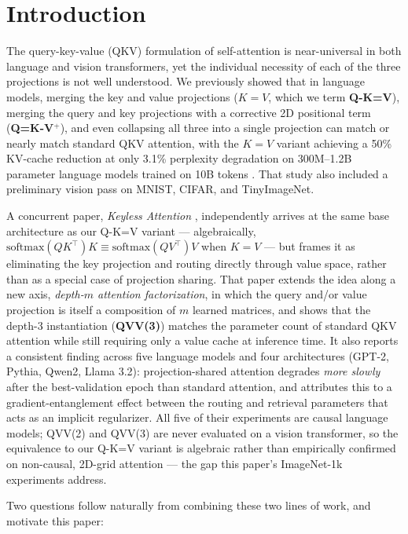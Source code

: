 \documentclass[11pt]{article}
\begin{document}
\section{Introduction}
\label{sec:intro}

The query-key-value (QKV) formulation of self-attention \citep{vaswani2017attention}
is near-universal in both language and vision transformers, yet the individual
necessity of each of the three projections is not well understood. We
previously showed that in language models, merging the key and value
projections (\(K = V\), which we term \textbf{Q-K=V}), merging the query and
key projections with a corrective 2D positional term (\textbf{Q=K-V}\(^+\)),
and even collapsing all three into a single projection can match or nearly
match standard QKV attention, with the \(K{=}V\) variant achieving a 50\%
KV-cache reduction at only 3.1\% perplexity degradation on 300M--1.2B
parameter language models trained on 10B tokens \citep{kayyam2026three}.
That study also included a preliminary vision pass on MNIST, CIFAR, and
TinyImageNet.

A concurrent paper, \emph{Keyless Attention} \citep{gao2026keyless},
independently arrives at the same base architecture as our Q-K=V variant ---
algebraically, \(\mathrm{softmax}(QK^\top)K \equiv \mathrm{softmax}(QV^\top)V\)
when \(K=V\) --- but frames it as eliminating the key projection and routing
directly through value space, rather than as a special case of projection
sharing. That paper extends the idea along a new axis, \emph{depth-\(m\)
attention factorization}, in which the query and/or value projection is
itself a composition of \(m\) learned matrices, and shows that the depth-3
instantiation (\textbf{QVV(3)}) matches the parameter count of standard QKV
attention while still requiring only a value cache at inference time. It
also reports a consistent finding across five language models and four
architectures (GPT-2, Pythia, Qwen2, Llama 3.2): projection-shared attention
degrades \emph{more slowly} after the best-validation epoch than standard
attention, and attributes this to a gradient-entanglement effect between the
routing and retrieval parameters that acts as an implicit regularizer. All
five of their experiments are causal language models; QVV(2) and QVV(3) are
never evaluated on a vision transformer, so the equivalence to our Q-K=V
variant is algebraic rather than empirically confirmed on non-causal,
2D-grid attention --- the gap this paper's ImageNet-1k experiments address.

Two questions follow naturally from combining these two lines of work, and
motivate this paper:
\end{document}
